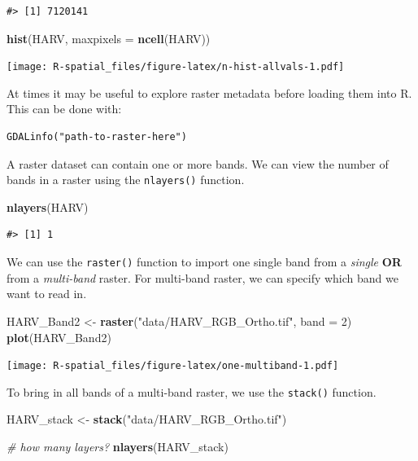 \documentclass[]{book}
\newenvironment{Shaded}{\begin{snugshade}}{\end{snugshade}}
\newcommand{\KeywordTok}[1]{\textcolor[rgb]{0.13,0.29,0.53}{\textbf{#1}}}
\newcommand{\DataTypeTok}[1]{\textcolor[rgb]{0.13,0.29,0.53}{#1}}
\newcommand{\DecValTok}[1]{\textcolor[rgb]{0.00,0.00,0.81}{#1}}
\newcommand{\StringTok}[1]{\textcolor[rgb]{0.31,0.60,0.02}{#1}}
\newcommand{\CommentTok}[1]{\textcolor[rgb]{0.56,0.35,0.01}{\textit{#1}}}
\newcommand{\NormalTok}[1]{#1}
\begin{document}
\begin{verbatim}
#> [1] 7120141
\end{verbatim}

\begin{Shaded}
\begin{Highlighting}[]
\KeywordTok{hist}\NormalTok{(HARV, }\DataTypeTok{maxpixels =} \KeywordTok{ncell}\NormalTok{(HARV))}
\end{Highlighting}
\end{Shaded}

\texttt{[image: R-spatial\_files/figure-latex/n-hist-allvals-1.pdf]}

At times it may be useful to explore raster metadata before loading them
into R. This can be done with:

\begin{verbatim}
GDALinfo("path-to-raster-here") 
\end{verbatim}

A raster dataset can contain one or more bands. We can view the number
of bands in a raster using the \texttt{nlayers()} function.

\begin{Shaded}
\begin{Highlighting}[]
\KeywordTok{nlayers}\NormalTok{(HARV)}
\end{Highlighting}
\end{Shaded}

\begin{verbatim}
#> [1] 1
\end{verbatim}

We can use the \texttt{raster()} function to import one single band from
a \emph{single} \textbf{OR} from a \emph{multi-band} raster. For
multi-band raster, we can specify which band we want to read in.

\begin{Shaded}
\begin{Highlighting}[]
\NormalTok{HARV_Band2 <-}\StringTok{ }\KeywordTok{raster}\NormalTok{(}\StringTok{"data/HARV_RGB_Ortho.tif"}\NormalTok{, }\DataTypeTok{band =} \DecValTok{2}\NormalTok{)}
\KeywordTok{plot}\NormalTok{(HARV_Band2)}
\end{Highlighting}
\end{Shaded}

\texttt{[image: R-spatial\_files/figure-latex/one-multiband-1.pdf]}

To bring in all bands of a multi-band raster, we use the
\texttt{stack()} function.

\begin{Shaded}
\begin{Highlighting}[]
\NormalTok{HARV_stack <-}\StringTok{ }\KeywordTok{stack}\NormalTok{(}\StringTok{"data/HARV_RGB_Ortho.tif"}\NormalTok{)}

\CommentTok{# how many layers?}
\KeywordTok{nlayers}\NormalTok{(HARV_stack)}
\end{Highlighting}
\end{Shaded}
\end{document}
